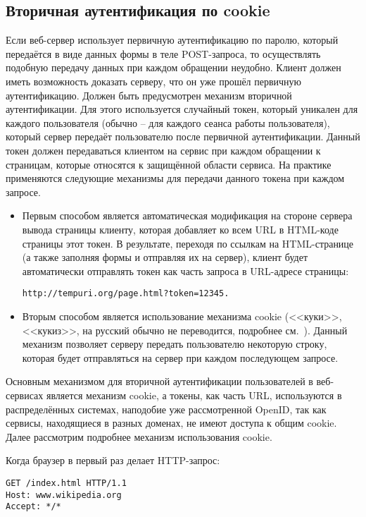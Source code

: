 \subsection{Вторичная аутентификация по cookie}

Если веб-сервер использует первичную аутентификацию по паролю, который передаётся в виде данных формы в теле POST-запроса, то осуществлять подобную передачу данных при каждом обращении неудобно. Клиент должен иметь возможность доказать серверу, что он уже прошёл первичную аутентификацию. Должен быть предусмотрен механизм вторичной аутентификации. Для этого используется случайный токен, который уникален для каждого пользователя (обычно -- для каждого сеанса работы пользователя), который сервер передаёт пользователю после первичной аутентификации. Данный токен должен передаваться клиентом на сервис при каждом обращении к страницам, которые относятся к защищённой области сервиса. На практике применяются следующие механизмы для передачи данного токена при каждом запросе.

\begin{itemize}
	\item Первым способом является автоматическая модификация на стороне сервера вывода страницы клиенту, которая добавляет ко всем URL в HTML-коде страницы этот токен. В результате, переходя по ссылкам на HTML-странице (а также заполняя формы и отправляя их на сервер), клиент будет автоматически отправлять токен как часть запроса в URL-адресе страницы:

\texttt{http://tempuri.org/page.html?token=12345.}
	\item Вторым способом является использование механизма cookie (<<куки>>, <<кукиз>>, на русский обычно не переводится, подробнее см.~\cite[Client Identification and Cookies]{Totty:2002}). Данный механизм позволяет серверу передать пользователю некоторую строку, которая будет отправляться на сервер при каждом последующем запросе.
\end{itemize}

Основным механизмом для вторичной аутентификации пользователей в веб-сервисах является механизм cookie, а токены, как часть URL, используются в распределённых системах, наподобие уже рассмотренной OpenID, так как сервисы, находящиеся в разных доменах, не имеют доступа к общим cookie. Далее рассмотрим подробнее механизм использования cookie.

Когда браузер в первый раз делает HTTP-запрос:
\begin{center} \begin{verbatim}
GET /index.html HTTP/1.1
Host: www.wikipedia.org
Accept: */*
\end{verbatim} \end{center}

